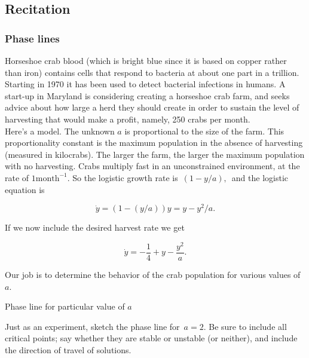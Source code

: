 \clearpage

\subsection{Recitation}

\subsubsection{Phase lines}

Horseshoe crab blood (which is bright blue since it is based on copper rather than iron)
contains cells that respond to bacteria at about one part in a trillion.
Starting in 1970 it has been used to detect bacterial infections in humans.
A start-up in Maryland is considering creating a horseshoe crab farm,
and seeks advice about how large a herd they should create
in order to sustain the level of harvesting that would make a profit, namely, 250 crabs per month.\\

Here's a model. The unknown $a$ is proportional to the size of the farm.
This proportionality constant is the maximum population in the absence of harvesting
(measured in kilocrabs).
The larger the farm, the larger the maximum population with no harvesting.
Crabs multiply fast in an unconstrained environment, at the rate of $1 \text{month}^{−1}$.
So the logistic growth rate is $\, (1−y/a),\,$ and the logistic equation is

\begin{equation*}
  \dot y = \left( 1 - (y/a) \right)y = y - y^2/a.  
\end{equation*}

If we now include the desired harvest rate we get

\begin{equation*}
  \dot y = -\frac{1}{4} + y - \frac{y^2}{a}. 
\end{equation*}

Our job is to determine the behavior of the crab population for various values of $a$.

\begin{problem}
  Phase line for particular value of $a$
\end{problem}

Just as an experiment, sketch the phase line for $\,a=2.$
Be sure to include all critical points; say whether they are stable or unstable
(or neither), and include the direction of travel of solutions. \\


